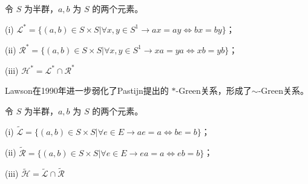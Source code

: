 \begin{definition}
    令 $S$ 为半群，$a, b$ 为 $S$ 的两个元素。

    (i) $\mathcal{L}^{\ast} = \{(a,b)\in S\times S| \forall x,y \in S^1 \rightarrow ax=ay \Leftrightarrow bx=by\}$；

    (ii) $\mathcal{R}^{\ast} = \{(a,b)\in S\times S| \forall x,y \in S^1 \rightarrow xa=ya \Leftrightarrow xb=yb\}$；

    (iii) $\mathcal{H}^{\ast} = \mathcal{L}^{\ast} \cap \mathcal{R}^{\ast}$
\end{definition}

Lawson在1990年进一步弱化了Pastijn提出的 $\ast$-Green关系，形成了$\sim$-Green关系。

\begin{definition}
    令 $S$ 为半群，$a, b$ 为 $S$ 的两个元素。

    (i) $\tilde{\mathcal{L}} = \{(a,b)\in S\times S| \forall e \in E \rightarrow ae=a \Leftrightarrow be=b\}$；

    (ii) $\tilde{\mathcal{R}} = \{(a,b)\in S\times S| \forall e \in E \rightarrow ea=a \Leftrightarrow eb=b\}$；

    (iii) $\tilde{\mathcal{H}} = \tilde{\mathcal{L}} \cap \tilde{\mathcal{R}}$
\end{definition}


